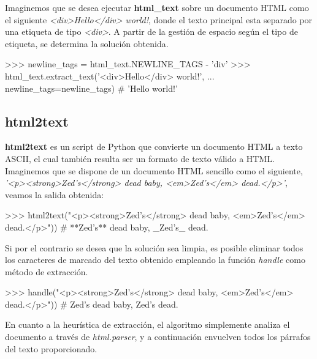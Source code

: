 Imaginemos que se desea ejecutar \textbf{html\_text} sobre un documento HTML como el siguiente
\emph{<div>Hello</div> world!}, donde el texto principal esta separado por una etiqueta de tipo \emph{<div>}.
A partir de la gestión de espacio según el tipo de etiqueta, se determina la solución obtenida.

\begin{Schunk}
  \begin{Soutput}
    >>> newline_tags = html_text.NEWLINE_TAGS - {'div'}
    >>> html_text.extract_text('<div>Hello</div> world!',
    ...                        newline_tags=newline_tags)
    # 'Hello world!'
  \end{Soutput}
\end{Schunk}

\subsection{html2text}
\label{subsec:html2text}

\textbf{html2text} \cite{html2text} es un script de Python que convierte un documento HTML a texto ASCII, 
el cual también resulta ser un formato de texto válido a HTML. Imaginemos que se dispone de un documento 
HTML sencillo como el siguiente, \emph{'<p><strong>Zed's</strong> dead baby, <em>Zed's</em> dead.</p>'}, 
veamos la salida obtenida:

\begin{Schunk}
  \begin{Soutput}
    >>> html2text("<p><strong>Zed's</strong> dead baby, <em>Zed's</em> dead.</p>"))
    # **Zed's** dead baby, _Zed's_ dead.
  \end{Soutput}
\end{Schunk}

Si por el contrario se desea que la solución sea limpia, es posible eliminar todos los caracteres de
marcado del texto obtenido empleando la función \emph{handle} como método de extracción.

\begin{Schunk}
  \begin{Soutput}
    >>> handle("<p><strong>Zed's</strong> dead baby, <em>Zed's</em> dead.</p>"))
    # Zed's dead baby, Zed's dead.
  \end{Soutput}
\end{Schunk}

En cuanto a la heurística de extracción, el algoritmo simplemente analiza el documento a través de
\emph{html.parser}, y a continuación envuelven todos los párrafos del texto proporcionado.

